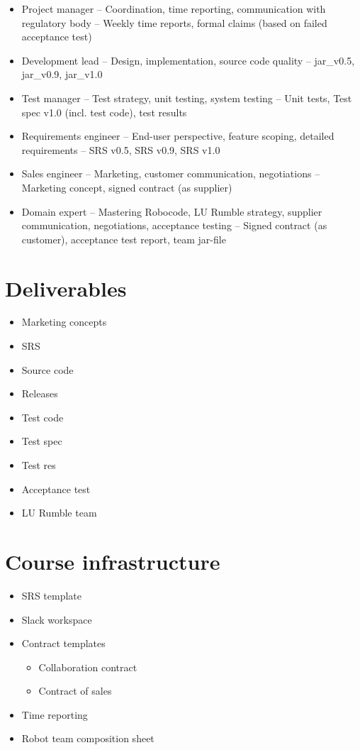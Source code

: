 \documentclass{scrreprt}
\begin{document}
\begin{itemize}
\item Project manager -- Coordination, time reporting, communication with regulatory body -- Weekly time reports, formal claims (based on failed acceptance test)
\item Development lead -- Design, implementation, source code quality -- jar_v0.5, jar_v0.9, jar_v1.0
\item Test manager -- Test strategy, unit testing, system testing -- Unit tests, Test spec v1.0 (incl. test code), test results
\item Requirements engineer -- End-user perspective, feature scoping, detailed requirements -- SRS v0.5, SRS v0.9, SRS v1.0
\item Sales engineer -- Marketing, customer communication, negotiations -- Marketing concept, signed contract (as supplier)
\item Domain expert -- Mastering Robocode, LU Rumble strategy, supplier communication, negotiations, acceptance testing -- Signed contract (as customer), acceptance test report, team jar-file
\end{itemize}

\section{Deliverables}
\begin{itemize}
\item Marketing concepts
\item SRS
\item Source code
\item Releases
\item Test code
\item Test spec
\item Test res
\item Acceptance test
\item LU Rumble team
\end{itemize}

\section{Course infrastructure}
\begin{itemize}
\item SRS template
\item Slack workspace
\item Contract templates
\begin{itemize}
\item Collaboration contract
\item Contract of sales
\end{itemize}
\item Time reporting
\item Robot team composition sheet
\end{itemize}
\end{document}
